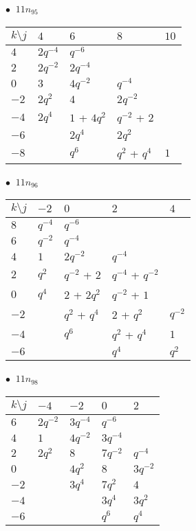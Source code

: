 %
\begin{minipage}{\linewidth}
$\bullet\ $ $11n_{95}$ \vspace{0.5em} \\
\begin{tabular}{l|llll}
$k \setminus j$ & $4$ & $6$ & $8$ & $10$ \\
\hline
$4$ & $2q^{-4}$ & $q^{-6}$ &  &  \\
$2$ & $2q^{-2}$ & $2q^{-4}$ &  &  \\
$0$ & $3$ & $4q^{-2}$ & $q^{-4}$ &  \\
$-2$ & $2q^{2}$ & $4$ & $2q^{-2}$ &  \\
$-4$ & $2q^{4}$ & $1$ + $4q^{2}$ & $q^{-2}$ + $2$ &  \\
$-6$ &  & $2q^{4}$ & $2q^{2}$ &  \\
$-8$ &  & $q^{6}$ & $q^{2}$ + $q^{4}$ & $1$ \\
\end{tabular}
\vspace{2em}
\end{minipage}
%
\begin{minipage}{\linewidth}
$\bullet\ $ $11n_{96}$ \vspace{0.5em} \\
\begin{tabular}{l|llll}
$k \setminus j$ & $-2$ & $0$ & $2$ & $4$ \\
\hline
$8$ & $q^{-4}$ & $q^{-6}$ &  &  \\
$6$ & $q^{-2}$ & $q^{-4}$ &  &  \\
$4$ & $1$ & $2q^{-2}$ & $q^{-4}$ &  \\
$2$ & $q^{2}$ & $q^{-2}$ + $2$ & $q^{-4}$ + $q^{-2}$ &  \\
$0$ & $q^{4}$ & $2$ + $2q^{2}$ & $q^{-2}$ + $1$ &  \\
$-2$ &  & $q^{2}$ + $q^{4}$ & $2$ + $q^{2}$ & $q^{-2}$ \\
$-4$ &  & $q^{6}$ & $q^{2}$ + $q^{4}$ & $1$ \\
$-6$ &  &  & $q^{4}$ & $q^{2}$ \\
\end{tabular}
\vspace{2em}
\end{minipage}
%
\begin{minipage}{\linewidth}
$\bullet\ $ $11n_{98}$ \vspace{0.5em} \\
\begin{tabular}{l|llll}
$k \setminus j$ & $-4$ & $-2$ & $0$ & $2$ \\
\hline
$6$ & $2q^{-2}$ & $3q^{-4}$ & $q^{-6}$ &  \\
$4$ & $1$ & $4q^{-2}$ & $3q^{-4}$ &  \\
$2$ & $2q^{2}$ & $8$ & $7q^{-2}$ & $q^{-4}$ \\
$0$ &  & $4q^{2}$ & $8$ & $3q^{-2}$ \\
$-2$ &  & $3q^{4}$ & $7q^{2}$ & $4$ \\
$-4$ &  &  & $3q^{4}$ & $3q^{2}$ \\
$-6$ &  &  & $q^{6}$ & $q^{4}$ \\
\end{tabular}
\vspace{2em}
\end{minipage}
